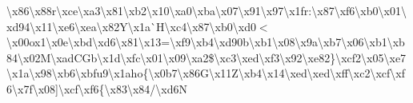\begin{DoxyCompactItemize}
\textbackslash{}x86\textbackslash{}x88r\textquotesingle{}\textbackslash{}xce\textbackslash{}xa3\textbackslash{}x81\textbackslash{}xb2\textbackslash{}x10\textbackslash{}xa0\textbackslash{}xba\textbackslash{}x07\textbackslash{}x91\textbackslash{}x97\textbackslash{}x1fr\+:\textbackslash{}x87\textbackslash{}xf6\textbackslash{}xb0\textbackslash{}x01\textbackslash{}xd94\textbackslash{}x11\textbackslash{}xe6\textbackslash{}xea\textbackslash{}x82\+Y\textbackslash{}x1a\`{}\+H\textbackslash{}xc4\textbackslash{}x87\textbackslash{}xb0\textbackslash{}xd0$<$\textbackslash{}x00ox1\textbackslash{}x0e\textbackslash{}xbd\textbackslash{}xd6\textbackslash{}x81\textbackslash{}x13=\textbackslash{}xf9\textbackslash{}xb4\textbackslash{}xd90b\textbackslash{}xb1\textbackslash{}x08\textbackslash{}x9a\textbackslash{}xb7\textbackslash{}x06\textbackslash{}xb1\textbackslash{}xb84\textbackslash{}x02\+M\textbackslash{}xad\+C\+Gb\textbackslash{}x1d\textbackslash{}xfc\textbackslash{}x01\textbackslash{}x09\textbackslash{}xa2\$\textbackslash{}xc3\textbackslash{}xed\textbackslash{}xf3\textbackslash{}x92\textbackslash{}xe82\}\textbackslash{}xcf2\textbackslash{}x05\textbackslash{}xe7\textbackslash{}x1a\textbackslash{}x98\textbackslash{}xb6\textbackslash{}xbfu9\textbackslash{}x1aho\{\textbackslash{}x0b7\textbackslash{}x86\+G\textbackslash{}x11\+Z\textbackslash{}xb4\textbackslash{}x14\textbackslash{}xed\textbackslash{}xed\textbackslash{}xff\textbackslash{}xc2\textbackslash{}xcf\textbackslash{}xf6\textbackslash{}x7f\textbackslash{}x08\mbox{]}\textbackslash{}xcf\textbackslash{}xf6\{\textbackslash{}x83\textbackslash{}x84/\textbackslash{}xd6\+N 
\end{DoxyCompactItemize}
